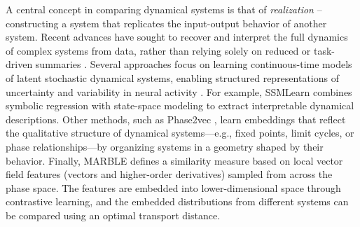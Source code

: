 \documentclass{article}
\newcommand{\ascomment}[1]{\textcolor{ascolor}{(#1)}}
\theoremstyle{definition} \newtheorem{definition}{Definition}  \newtheorem{example}{Example}
\theoremstyle{remark} \newtheorem{remark}{Remark}
\newcounter{ct}
\begin{document}






A central concept in comparing dynamical systems is that of \emph{realization} -- constructing a system that replicates the input-output behavior of another system\citep{grigoryeva2020dimension, gonon2023approximation}.
%
Recent advances have sought to recover and interpret the full dynamics of complex systems from data, rather than relying solely on reduced or task-driven summaries \citep{durstewitz2023reconstructing, brenner2024almost}.
Several approaches focus on learning continuous-time models of latent stochastic dynamical systems, enabling structured representations of uncertainty and variability in neural activity \citep{duncker2019learning}.
For example, SSMLearn \citep{cenedese2022data} combines symbolic regression with state-space modeling to extract interpretable dynamical descriptions.
Other methods, such as Phase2vec \citep{ricci2022phase2vec}, learn embeddings that reflect the qualitative structure of dynamical systems—e.g., fixed points, limit cycles, or phase relationships—by organizing systems in a geometry shaped by their behavior.
Finally, MARBLE defines a similarity measure based on local vector field features (vectors and higher-order derivatives) sampled from across the phase space.
The features are embedded into lower-dimensional space through contrastive learning, and the embedded distributions from different systems can be compared using an optimal transport distance\citep{gosztolai2025marble}.
\end{document}
